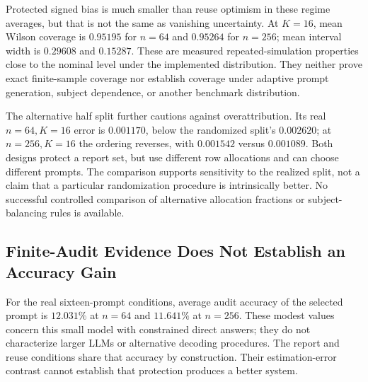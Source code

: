 \documentclass{article}
\begin{document}
\begin{table}[t]
\centering\small
\caption{Known-truth diagnostic means for $K=16$, equally weighting seeds and $n=64,256$. Bias is protected-report minus truth; optimism is selection reuse minus truth. Coupling is the shared-branch probability in Equation~\ref{eq:synthetic}. Coverage and interval width refer to the protected Wilson interval. Percentage points (pp) are used only for the two signed errors.}
\label{tab:regimes}

\end{table}

Protected signed bias is much smaller than reuse optimism in these regime averages, but that is not the same as vanishing uncertainty. At $K=16$, mean Wilson coverage is $0.95195$ for $n=64$ and $0.95264$ for $n=256$; mean interval width is $0.29608$ and $0.15287$. These are measured repeated-simulation properties close to the nominal level under the implemented distribution. They neither prove exact finite-sample coverage nor establish coverage under adaptive prompt generation, subject dependence, or another benchmark distribution.

The alternative half split further cautions against overattribution. Its real $n=64,K=16$ error is $0.001170$, below the randomized split's $0.002620$; at $n=256,K=16$ the ordering reverses, with $0.001542$ versus $0.001089$. Both designs protect a report set, but use different row allocations and can choose different prompts. The comparison supports sensitivity to the realized split, not a claim that a particular randomization procedure is intrinsically better. No successful controlled comparison of alternative allocation fractions or subject-balancing rules is available.

\subsection{Finite-Audit Evidence Does Not Establish an Accuracy Gain}
For the real sixteen-prompt conditions, average audit accuracy of the selected prompt is $12.031\%$ at $n=64$ and $11.641\%$ at $n=256$. These modest values concern this small model with constrained direct answers; they do not characterize larger LLMs or alternative decoding procedures. The report and reuse conditions share that accuracy by construction. Their estimation-error contrast cannot establish that protection produces a better system.
\end{document}
